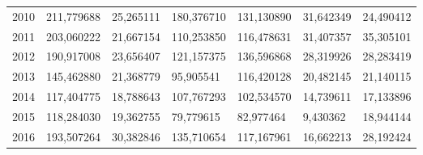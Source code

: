\begin{table}
\begin{tabular}{p{1cm}p{2cm}p{2cm}p{2cm}p{2cm}p{2cm}p{2cm}}
 2010 &      211,779688 &                         25,265111 &                          180,376710 &                            131,130890 & 31,642349 &                        24,490412 \\
 2011 &      203,060222 &                         21,667154 &                          110,253850 &                            116,478631 & 31,407357 &                        35,305101 \\
 2012 &      190,917008 &                         23,656407 &                          121,157375 &                            136,596868 & 28,319926 &                        28,283419 \\
 2013 &      145,462880 &                         21,368779 &                           95,905541 &                            116,420128 & 20,482145 &                        21,140115 \\
 2014 &      117,404775 &                         18,788643 &                          107,767293 &                            102,534570 & 14,739611 &                        17,133896 \\
 2015 &      118,284030 &                         19,362755 &                           79,779615 &                             82,977464 &  9,430362 &                        18,944144 \\
 2016 &      193,507264 &                         30,382846 &                          135,710654 &                            117,167961 & 16,662213 &                        28,192424 \\
\bottomrule
\end{tabular}
\end{table}
